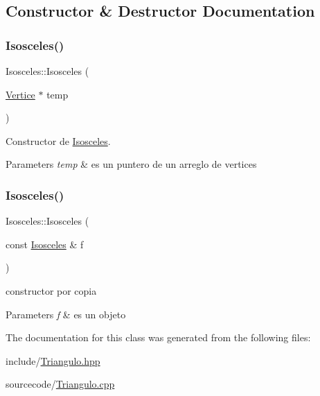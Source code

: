 \subsection{Constructor \& Destructor Documentation}
\mbox{\label{class_isosceles_a5dc812e7ac02a71016cdc2175176608a}} 
\subsubsection{\texorpdfstring{Isosceles()}{Isosceles()}\hspace{0.1cm}{\footnotesize\ttfamily [1/2]}}
{\footnotesize\ttfamily Isosceles\+::\+Isosceles (\begin{DoxyParamCaption}\item[{\hyperlink{class_vertice}{Vertice} $\ast$}]{temp }\end{DoxyParamCaption})}



Constructor de \hyperlink{class_isosceles}{Isosceles}. 


\begin{DoxyParams}{Parameters}
{\em temp} & es un puntero de un arreglo de vertices \\
\hline
\end{DoxyParams}
\mbox{\label{class_isosceles_a7190cc477e9835205f3061633f73825f}} 
\subsubsection{\texorpdfstring{Isosceles()}{Isosceles()}\hspace{0.1cm}{\footnotesize\ttfamily [2/2]}}
{\footnotesize\ttfamily Isosceles\+::\+Isosceles (\begin{DoxyParamCaption}\item[{const \hyperlink{class_isosceles}{Isosceles} \&}]{f }\end{DoxyParamCaption})}



constructor por copia 


\begin{DoxyParams}{Parameters}
{\em f} & es un objeto \\
\hline
\end{DoxyParams}


The documentation for this class was generated from the following files\+:\begin{DoxyCompactItemize}
\item 
include/\hyperlink{_triangulo_8hpp}{Triangulo.\+hpp}\item 
sourcecode/\hyperlink{_triangulo_8cpp}{Triangulo.\+cpp}\end{DoxyCompactItemize}
